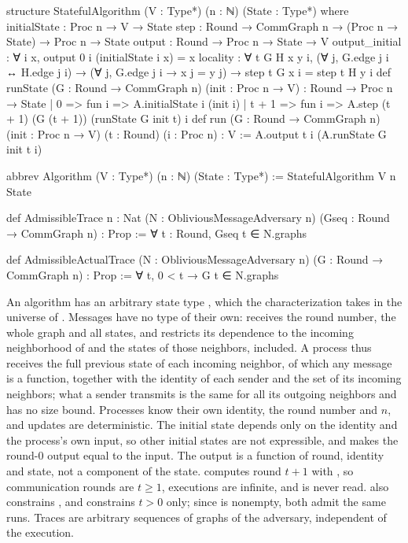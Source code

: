\begin{leanlisting}
\begin{leancode}
structure StatefulAlgorithm (V : Type*) (n : ℕ) (State : Type*) where
  initialState : Proc n → V → State
  step : Round → CommGraph n → (Proc n → State) → Proc n → State
  output : Round → Proc n → State → V
  output_initial : ∀ i x, output 0 i (initialState i x) = x
  locality : ∀ t G H x y i,
    (∀ j, G.edge j i ↔ H.edge j i) →
    (∀ j, G.edge j i → x j = y j) → step t G x i = step t H y i
def runState (G : Round → CommGraph n) (init : Proc n → V) : Round → Proc n → State
  | 0 => fun i => A.initialState i (init i)
  | t + 1 => fun i => A.step (t + 1) (G (t + 1)) (runState G init t) i
def run (G : Round → CommGraph n) (init : Proc n → V) (t : Round) (i : Proc n) : V :=
  A.output t i (A.runState G init t i)
\end{leancode}
\begin{leancode}
abbrev Algorithm (V : Type*) (n : ℕ) (State : Type*) := StatefulAlgorithm V n State
\end{leancode}
\begin{leancode}
def AdmissibleTrace
    {n : Nat} (N : ObliviousMessageAdversary n) (Gseq : Round → CommGraph n) : Prop :=
  ∀ t : Round, Gseq t ∈ N.graphs
\end{leancode}
\begin{leancode}
def AdmissibleActualTrace (N : ObliviousMessageAdversary n) (G : Round → CommGraph n) : Prop :=
  ∀ t, 0 < t → G t ∈ N.graphs
\end{leancode}
\end{leanlisting}

An algorithm has an arbitrary state type , which the characterization takes in the universe of . Messages have no type of their own:  receives the round number, the whole graph and all states, and  restricts its dependence to the incoming neighborhood of  and the states of those neighbors,  included. A process thus receives the full previous state of each incoming neighbor, of which any message is a function, together with the identity of each sender and the set of its incoming neighbors; what a sender transmits is the same for all its outgoing neighbors and has no size bound. Processes know their own identity, the round number and $n$, and updates are deterministic. The initial state depends only on the identity and the process's own input, so other initial states are not expressible, and  makes the round-$0$ output equal to the input. The output is a function  of round, identity and state, not a component of the state.  computes round $t+1$ with , so communication rounds are $t\geq1$, executions are infinite, and  is never read.  also constrains , and  constrains $t>0$ only; since  is nonempty, both admit the same runs. Traces are arbitrary sequences of graphs of the adversary, independent of the execution.

